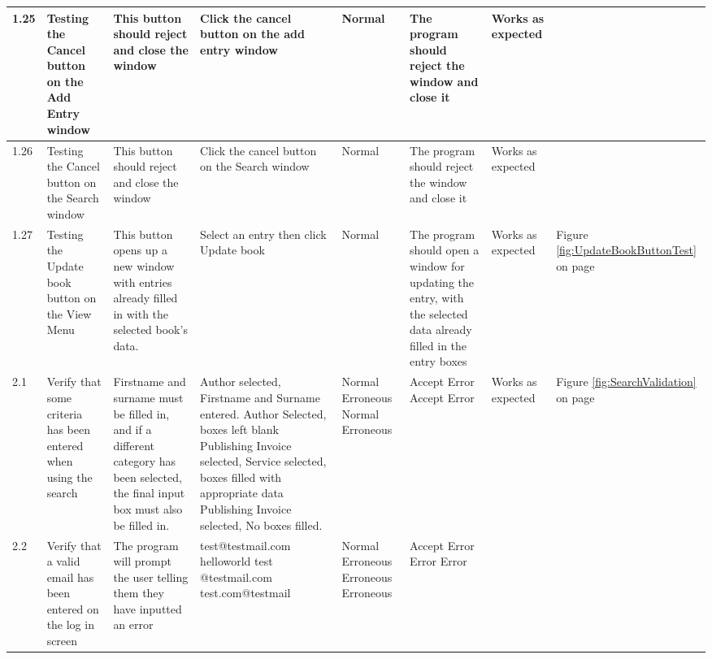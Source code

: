 \begin{landscape}
\begin{center}
\begin{longtable}{|p{1.5cm}|p{2cm}|p{2.5cm}|p{2.5cm}|p{2cm}|p{2cm}|p{2cm}|p{2cm}|}
\rowcolor{lightgray} 1.25 & Testing the Cancel button on the Add Entry window & This button should reject and close the window & Click the cancel button on the add entry window & Normal & The program should reject the window and close it & Works as expected & \\ \hline
\rowcolor{lightgray} 1.26 & Testing the Cancel button on the Search window & This button should reject and close the window & Click the cancel button on the Search window & Normal & The program should reject the window and close it & Works as expected & \\ \hline
\rowcolor{lightgray} 1.27 & Testing the Update book button on the View Menu & This button opens up a new window with entries already filled in with the selected book's data. & Select an entry then click Update book & Normal & The program should open a window for updating the entry, with the selected data already filled in the entry boxes & Works as expected & Figure \ref{fig:UpdateBookButtonTest} on page \pageref{fig:UpdateBookButtonTest} \\ \hline
\rowcolor{lightgray} 2.1 & Verify that some criteria has been entered when using the search & Firstname and surname must be filled in, and if a different category has been selected, the final input box must also be filled in. & Author selected, Firstname and Surname entered. \newline Author Selected, boxes left blank \newline Publishing Invoice selected, Service selected, boxes filled with appropriate data \newline Publishing Invoice selected, No boxes filled. & Normal \newline Erroneous \newline Normal \newline Erroneous & Accept \newline Error \newline Accept \newline Error & Works as expected & Figure \ref{fig:SearchValidation} on page \pageref{fig:SearchValidation} \\ \hline
\rowcolor{gray} 2.2 & Verify that a valid email has been entered on the log in screen &  The program will prompt the user telling them they have inputted an error & test@testmail.com \newline helloworld \newline test \newline @testmail.com \newline test.com@testmail & Normal \newline Erroneous \newline Erroneous \newline Erroneous & Accept \newline Error \newline Error \newline Error & & \\ \hline

\end{longtable}
\end{center}
\end{landscape}
